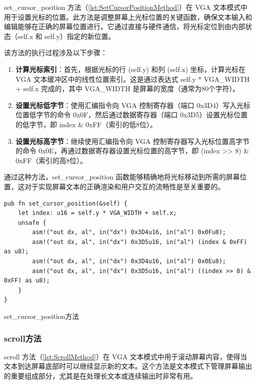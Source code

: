 set\_cursor\_position 方法（\cref{lst:SetCursorPositionMethod}）在 VGA 文本模式中用于设置光标的位置。此方法是调整屏幕上光标位置的关键函数，确保文本输入和编辑能够在正确的屏幕位置进行。它通过直接与硬件通信，将光标定位到由内部状态（self.x 和 self.y）指定的新位置。

该方法的执行过程涉及以下步骤：

\begin{enumerate}
    \item \textbf{计算光标索引}：首先，根据光标的行 (self.y) 和列 (self.x) 坐标，计算光标在 VGA 文本缓冲区中的线性位置索引。这是通过表达式 self.y * VGA\_WIDTH + self.x 完成的，其中 VGA\_WIDTH 是屏幕的宽度（通常为80个字符）。
    \item \textbf{设置光标低字节}：使用汇编指令向 VGA 控制寄存器（端口 0x3D4）写入光标位置低字节的命令 0x0F，然后通过数据寄存器（端口 0x3D5）设置光标位置的低字节，即 index \& 0xFF（索引的低8位）。
    \item \textbf{设置光标高字节}：继续使用汇编指令向 VGA 控制寄存器写入光标位置高字节的命令 0x0E，再通过数据寄存器设置光标位置的高字节，即 (index >> 8) \& 0xFF（索引的高8位）。
\end{enumerate}

通过这种方法，set\_cursor\_position 函数能够精确地将光标移动到所需的屏幕位置，这对于实现屏幕文本的正确渲染和用户交互的流畅性是至关重要的。

\begin{listing}[htbp]
    \begin{verbatim}
pub fn set_cursor_position(&self) {
    let index: u16 = self.y * VGA_WIDTH + self.x;
    unsafe {
        asm!("out dx, al", in("dx") 0x3D4u16, in("al") 0x0Fu8);
        asm!("out dx, al", in("dx") 0x3D5u16, in("al") (index & 0xFF) as u8);
        asm!("out dx, al", in("dx") 0x3D4u16, in("al") 0x0Eu8);
        asm!("out dx, al", in("dx") 0x3D5u16, in("al") ((index >> 8) & 0xFF) as u8);
    }
}
    \end{verbatim}
    \caption{set\_cursor\_position方法}\label{lst:SetCursorPositionMethod}
\end{listing}

\subsubsection{scroll方法}

scroll 方法（\cref{lst:ScrollMethod}）在 VGA 文本模式中用于滚动屏幕内容，使得当文本到达屏幕底部时可以继续显示新的文本。这个方法是文本模式下管理屏幕输出的重要组成部分，尤其是在处理长文本或连续输出时非常有用。

